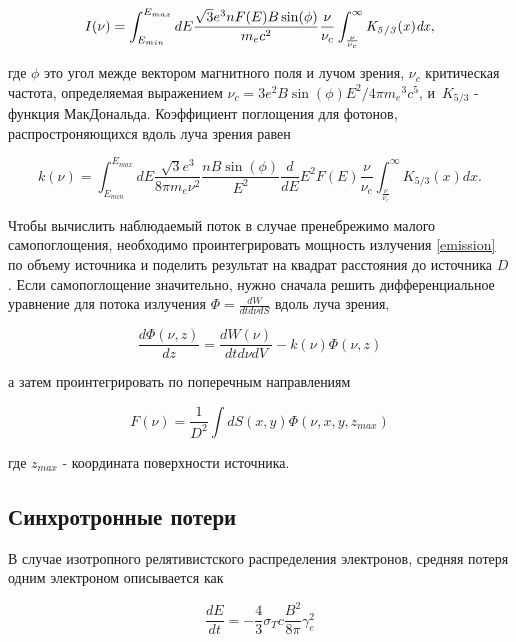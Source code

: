 \begin{equation} \label{emission}
	I(\nu)=\int_{E_{min}}^{E_{max}} dE \frac {\sqrt {3}{e}^{3}n F(E) B \sin ( \phi)}{{m_e}{c}^{2}}
	\frac{\nu}{\nu_c}\int_{\frac {\nu}{\nu_c}}^{\infty }\it K_{5/3}(x)dx,
\end{equation}

где $\phi$ это угол межде вектором магнитного поля и лучом зрения, $\displaystyle\nu_{c}$ критическая частота, определяемая выражением $\displaystyle\nu_{c} = 3 e^{2} B \sin(\phi) E^{2}/4\pi {m_{e}}^{3} c^{5}$, и~$K_{5/3}$ - функция МакДональда.
Коэффициент поглощения для фотонов, распростроняющихся вдоль луча зрения равен

\begin{equation}\label{absorption}
	k(\nu)=\int_{E_{min}}^{E_{max}}dE\frac {\sqrt {3}{e}^{3}}{8\pi m_e \nu^2}\frac{n B\sin(\phi)}{E^2}
	\frac{d}{dE} E^2 F(E)\frac {\nu}{ \nu_c}\int_{\frac {\nu}{ \nu_c}}^{\infty }K_{5/3}(x) dx.
\end{equation}

Чтобы вычислить наблюдаемый поток в случае пренебрежимо малого самопоглощения, необходимо проинтегрировать мощность излучения  \ref{emission} по объему источника и поделить результат на квадрат расстояния до источника  $D$. Если самопоглощение значительно, нужно сначала решить дифференциальное уравнение для потока излучения $\Phi=\frac{dW}{dt d\nu dS}$ вдоль луча зрения,

\begin{equation}
	\frac{d\Phi(\nu,z)}{dz} = \frac{dW(\nu)}{dt d\nu dV} - k(\nu)\Phi(\nu,z)
\end{equation}

а затем проинтегрировать по поперечным направлениям

\begin{equation}
	F(\nu)=\frac{1}{D^2}\int dS(x,y) \Phi(\nu, x,y,z_{max})
\end{equation}

где $z_{max}$ - координата поверхности источника.

\subsection*{Синхротронные потери}

В случае изотропного релятивистского распределения электронов, средняя потеря одним электроном описывается как

\begin{equation}
	\frac{dE}{dt} = -\frac{4}{3} \sigma_T c \frac{B^2}{8 \pi} \gamma_e^2
\end{equation}


